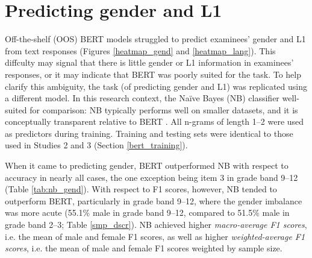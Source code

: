 \documentclass [PhD] {uclathes}
\begin{document}
\section{Predicting gender and L1}
\label{sec:appendix_nb}

Off-the-shelf (OOS) BERT models struggled to predict examinees' gender and L1 from text responses (Figures \ref{heatmap_gend} and \ref{heatmap_lang}). This diffculty may signal that there is little gender or L1 information in examinees' responses, or it may indicate that BERT was poorly suited for the task. To help clarify this ambiguity, the task (of predicting gender and L1) was replicated using a different model. In this research context, the Naïve Bayes (NB) classifier well-suited for comparison: NB typically performs well on smaller datasets, and it is conceptually transparent relative to BERT \citep{jurafskyspeech}. All n-grams of length 1–2 were used as predictors during training. Training and testing sets were identical to those used in Studies 2 and 3 (Section \ref{bert_training}). 

When it came to predicting gender, BERT outperformed NB with respect to accuracy in nearly all cases, the one exception being item 3 in grade band 9–12 (Table \ref{tab:nb_gend}). With respect to F1 scores, however, NB tended to outperform BERT, particularly in grade band 9–12, where the gender imbalance was more acute (55.1\% male in grade band 9–12, compared to 51.5\% male in grade band 2–3; Table \ref{smp_dscr}). NB achieved higher \emph{macro-average F1 scores}, i.e. the mean of male and female F1 scores, as well as higher \emph{weighted-average F1 scores}, i.e. the mean of male and female F1 scores weighted by sample size. 
\end{document}
